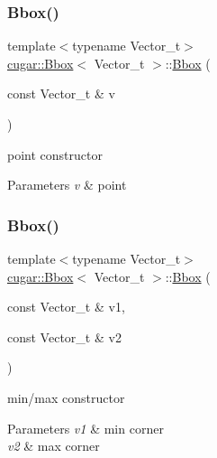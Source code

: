 \subsubsection{\texorpdfstring{Bbox()}{Bbox()}\hspace{0.1cm}{\footnotesize\ttfamily [2/5]}}
{\footnotesize\ttfamily template$<$typename Vector\+\_\+t$>$ \\
\hyperlink{structcugar_1_1_bbox}{cugar\+::\+Bbox}$<$ Vector\+\_\+t $>$\+::\hyperlink{structcugar_1_1_bbox}{Bbox} (\begin{DoxyParamCaption}\item[{const Vector\+\_\+t \&}]{v }\end{DoxyParamCaption})}

point constructor


\begin{DoxyParams}{Parameters}
{\em v} & point \\
\hline
\end{DoxyParams}
\mbox{\label{structcugar_1_1_bbox_a62c4be1df668eb7ce6aa251652d21646}} 
\subsubsection{\texorpdfstring{Bbox()}{Bbox()}\hspace{0.1cm}{\footnotesize\ttfamily [3/5]}}
{\footnotesize\ttfamily template$<$typename Vector\+\_\+t$>$ \\
\hyperlink{structcugar_1_1_bbox}{cugar\+::\+Bbox}$<$ Vector\+\_\+t $>$\+::\hyperlink{structcugar_1_1_bbox}{Bbox} (\begin{DoxyParamCaption}\item[{const Vector\+\_\+t \&}]{v1,  }\item[{const Vector\+\_\+t \&}]{v2 }\end{DoxyParamCaption})}

min/max constructor


\begin{DoxyParams}{Parameters}
{\em v1} & min corner \\
\hline
{\em v2} & max corner \\
\hline
\end{DoxyParams}
\mbox{\label{structcugar_1_1_bbox_af26d1a12b2e7fd9397b7c949cb312e0e}} 
